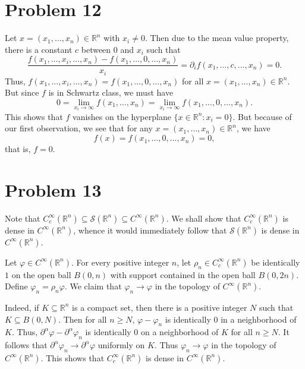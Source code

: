 \documentclass[10pt]{amsart}
\theoremstyle{thmstyle}
\theoremstyle{defstyle}
\newcommand{\R}{\mathbb{R}}
\newcommand{\scrS}{\mathscr S}
\renewcommand{\ge}{\geqslant}
\begin{document}
\section{Problem 12}

Let $x = (x_1,\dots,x_n)\in\R^n$ with $x_i\ne 0$. Then due to the mean value property, there is a constant $c$ between $0$ and $x_i$ such that 
\begin{equation*}
    \frac{f(x_1,\dots,x_i, \dots, x_n) - f(x_1,\dots, 0,\dots, x_n)}{x_i} = \partial_i f(x_1,\dots,c,\dots,x_n) = 0.
\end{equation*}
Thus, $f(x_1,\dots,x_i,\dots,x_n) = f(x_1,\dots,0,\dots,x_n)$ for all $x = (x_1,\dots,x_n)\in\R^n$. But since $f$ is in Schwartz class, we must have 
\begin{equation*}
    0 = \lim_{x_i\to\infty} f(x_1,\dots,x_n) = \lim_{x_i\to\infty}f(x_1,\dots,0,\dots,x_n).
\end{equation*}
This shows that $f$ vanishes on the hyperplane $\{x\in\R^n\colon  x_i = 0\}$. But because of our first observation, we see that for any $x = (x_1,\dots,x_n)\in\R^n$, we have 
\begin{equation*}
    f(x) = f(x_1,\dots,0,\dots, x_n) = 0,
\end{equation*}
that is, $f = 0$.

\section{Problem 13}

Note that $C_c^\infty(\R^n)\subseteq\scrS(\R^n)\subseteq C^\infty(\R^n)$. We shall show that $C_c^\infty(\R^n)$ is dense in $C^\infty(\R^n)$, whence it would immediately follow that $\scrS(\R^n)$ is dense in $C^\infty(\R^n)$.

Let $\varphi\in C^\infty(\R^n)$. For every positive integer $n$, let $\rho_n\in C_c^\infty(\R^n)$ be identically $1$ on the open ball $B(0, n)$ with support contained in the open ball $B(0, 2n)$. Define $\varphi_n = \rho_n\varphi$. We claim that $\varphi_n\to\varphi$ in the topology of $C^\infty(\R^n)$.

Indeed, if $K\subseteq\R^n$ is a compact set, then there is a positive integer $N$ such that $K\subseteq B(0, N)$. Then for all $n\ge N$, $\varphi - \varphi_n$ is identically $0$ in a neighborhood of $K$. Thus, $\partial^\alpha\varphi - \partial^\alpha\varphi_n$ is identically $0$ on a neighborhood of $K$ for all $n\ge N$. It follows that $\partial^\alpha\varphi_n\to\partial^\alpha\varphi$ uniformly on $K$. Thus $\varphi_n\to\varphi$ in the topology of $C^\infty(\R^n)$. This shows that $C_c^\infty(\R^n)$ is dense in $C^\infty(\R^n)$.
\end{document}
